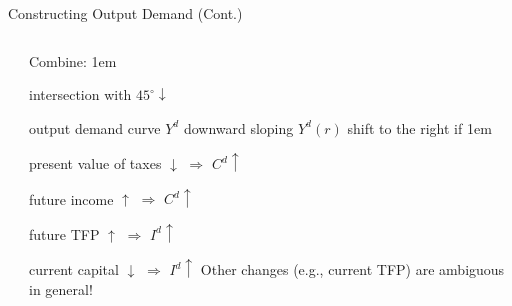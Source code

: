 \documentclass[11pt,aspectratio=43,usenames,dvipsnames]{beamer}
\let\oldenumerate=\enumerate
\let\endoldenumerate=\endenumerate
\renewenvironment{enumerate}{\oldenumerate \itemsep1em}{ \endoldenumerate}
\theoremstyle{definition}
\begin{document}
\begin{frame}{Constructing Output Demand (Cont.)}
\begin{columns}
\begin{column}{0.5\textwidth}
\begin{tikzpicture}[domain=0:5]
            \end{tikzpicture}

        \end{column}
        \begin{column}{0.5\textwidth}
            Combine:
            \begin{enumerate}
                \item intersection with $ 45^{\circ} \downarrow $
                \item \alert{output demand curve} $ Y^{d} $ downward sloping
            \end{enumerate}
            $ Y^{d}( r ) $ shift to the right if
            \begin{enumerate}
                \item present value of taxes $ \downarrow  $ $ \Rightarrow  $ $ C^{d} \uparrow  $
                \item future income $ \uparrow  $ $ \Rightarrow  $ $ C^{d} \uparrow  $
                \item future TFP $ \uparrow  $ $ \Rightarrow  $ $ I^{d} \uparrow $
                \item current capital $ \downarrow  $ $ \Rightarrow  $ $ I^{d} \uparrow  $
            \end{enumerate}
            Other changes (e.g., current TFP) are ambiguous in general!
        \end{column}
    \end{columns}
\end{frame}
\end{document}
